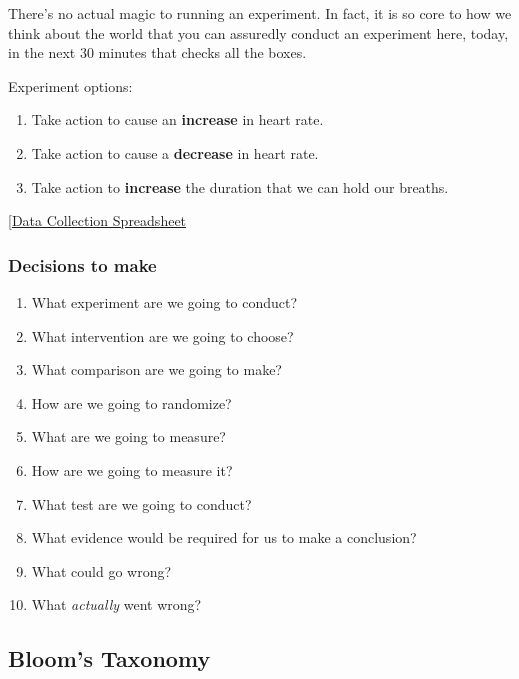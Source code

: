 \documentclass[
]{article}
\providecommand{\tightlist}{%
  \setlength{\itemsep}{0pt}\setlength{\parskip}{0pt}}
\theoremstyle{definition}
\theoremstyle{definition}
\theoremstyle{definition}
\theoremstyle{definition}
\theoremstyle{remark}
\begin{document}
There's no actual magic to running an experiment. In fact, it is so core to how we think about the world that you can assuredly conduct an experiment here, today, in the next 30 minutes that checks all the boxes.

Experiment options:

\begin{enumerate}
\def\labelenumi{\arabic{enumi}.}
\tightlist
\item
  Take action to cause an \textbf{increase} in heart rate.
\item
  Take action to cause a \textbf{decrease} in heart rate.
\item
  Take action to \textbf{increase} the duration that we can hold our breaths.
\end{enumerate}

{[}\href{https://docs.google.com/spreadsheets/d/1M3Q_AdYd1zBTP6FI2OGtQfjUsc5AKQJxmti2kp5_Fio/edit?usp=sharing}{Data Collection Spreadsheet}

\subsubsection{Decisions to make}\label{decisions-to-make}

\begin{enumerate}
\def\labelenumi{\arabic{enumi}.}
\tightlist
\item
  What experiment are we going to conduct?
\item
  What intervention are we going to choose?
\item
  What comparison are we going to make?
\item
  How are we going to randomize?
\item
  What are we going to measure?
\item
  How are we going to measure it?
\item
  What test are we going to conduct?
\item
  What evidence would be required for us to make a conclusion?
\item
  What could go wrong?
\item
  What \emph{actually} went wrong?
\end{enumerate}

\subsection*{Bloom's Taxonomy}\label{blooms-taxonomy}
\end{document}

